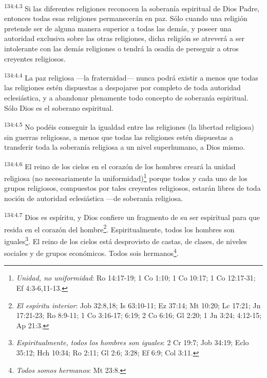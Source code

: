 \par 
\textsuperscript{134:4.3} Si las diferentes religiones reconocen la soberanía espiritual de Dios Padre, entonces todas esas religiones permanecerán en paz. Sólo cuando una religión pretende ser de alguna manera superior a todas las demás, y poseer una autoridad exclusiva sobre las otras religiones, dicha religión se atreverá a ser intolerante con las demás religiones o tendrá la osadía de perseguir a otros creyentes religiosos.

\par 
\textsuperscript{134:4.4} La paz religiosa ---la fraternidad--- nunca podrá existir a menos que todas las religiones estén dispuestas a despojarse por completo de toda autoridad eclesiástica, y a abandonar plenamente todo concepto de soberanía espiritual. Sólo Dios es el soberano espiritual.

\par 
\textsuperscript{134:4.5} No podéis conseguir la igualdad entre las religiones (la libertad religiosa) sin guerras religiosas, a menos que todas las religiones estén dispuestas a transferir toda la soberanía religiosa a un nivel superhumano, a Dios mismo.

\par 
\textsuperscript{134:4.6} El reino de los cielos en el corazón de los hombres creará la unidad religiosa (no necesariamente la uniformidad)\footnote{\textit{Unidad, no uniformidad}: Ro 14:17-19; 1 Co 1:10; 1 Co 10:17; 1 Co 12:17-31; Ef 4:3-6,11-13.} porque todos y cada uno de los grupos religiosos, compuestos por tales creyentes religiosos, estarán libres de toda noción de autoridad eclesiástica ---de soberanía religiosa.

\par 
\textsuperscript{134:4.7} Dios es espíritu, y Dios confiere un fragmento de su ser espiritual para que resida en el corazón del hombre\footnote{\textit{El espíritu interior}: Job 32:8,18; Is 63:10-11; Ez 37:14; Mt 10:20; Lc 17:21; Jn 17:21-23; Ro 8:9-11; 1 Co 3:16-17; 6:19; 2 Co 6:16; Gl 2:20; 1 Jn 3:24; 4:12-15; Ap 21:3.}. Espiritualmente, todos los hombres son iguales\footnote{\textit{Espiritualmente, todos los hombres son iguales}: 2 Cr 19:7; Job 34:19; Eclo 35:12; Hch 10:34; Ro 2:11; Gl 2:6; 3:28; Ef 6:9; Col 3:11.}. El reino de los cielos está desprovisto de castas, de clases, de niveles sociales y de grupos económicos. Todos sois hermanos\footnote{\textit{Todos somos hermanos}: Mt 23:8.}.

